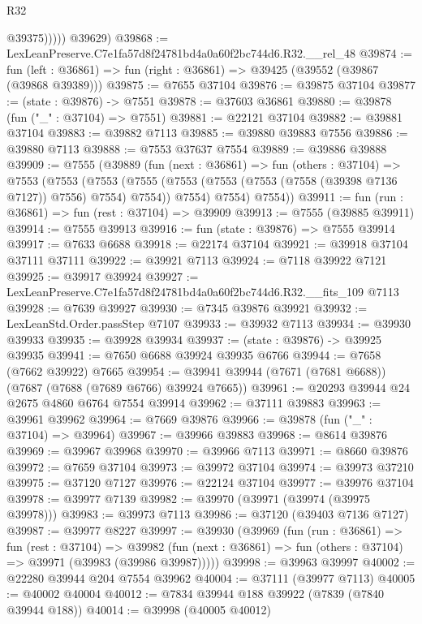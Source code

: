 \begin{lexlean}{R32}
\begin{coremodule}
                @39375)))))
      @39629)
@39868 := LexLeanPreserve.C7e1fa57d8f24781bd4a0a60f2bc744d6.R32.__rel_48
@39874 := fun (left : @36861) => fun (right : @36861) => @39425 (@39552 (@39867 (@39868 @39389)))
@39875 := @7655 @37104
@39876 := @39875 @37104
@39877 := (state : @39876) -> @7551
@39878 := @37603 @36861
@39880 := @39878 (fun ("_" : @37104) => @7551)
@39881 := @22121 @37104
@39882 := @39881 @37104
@39883 := @39882 @7113
@39885 := @39880 @39883 @7556
@39886 := @39880 @7113
@39888 := @7553 @37637 @7554
@39889 := @39886 @39888
@39909 := @7555
    (@39889
      (fun (next : @36861) =>
      fun (others : @37104) =>
      @7553
        (@7553
          (@7553
            (@7555 (@7553 (@7553 (@7553 (@7558 (@39398 @7136 @7127)) @7556) @7554) @7554))
            @7554)
          @7554)
        @7554))
@39911 := fun (run : @36861) => fun (rest : @37104) => @39909
@39913 := @7555 (@39885 @39911)
@39914 := @7555 @39913
@39916 := fun (state : @39876) => @7555 @39914
@39917 := @7633 @6688
@39918 := @22174 @37104
@39921 := @39918 @37104 @37111 @37111
@39922 := @39921 @7113
@39924 := @7118 @39922 @7121
@39925 := @39917 @39924
@39927 := LexLeanPreserve.C7e1fa57d8f24781bd4a0a60f2bc744d6.R32.__fits_109 @7113
@39928 := @7639 @39927
@39930 := @7345 @39876 @39921
@39932 := LexLeanStd.Order.passStep @7107
@39933 := @39932 @7113
@39934 := @39930 @39933
@39935 := @39928 @39934
@39937 := (state : @39876) -> @39925 @39935
@39941 := @7650 @6688 @39924 @39935 @6766
@39944 := @7658 (@7662 @39922) @7665
@39954 := @39941 @39944 (@7671 (@7681 @6688)) (@7687 (@7688 (@7689 @6766) @39924 @7665))
@39961 := @20293 @39944 @24 @2675 @4860 @6764 @7554 @39914
@39962 := @37111 @39883
@39963 := @39961 @39962
@39964 := @7669 @39876
@39966 := @39878 (fun ("_" : @37104) => @39964)
@39967 := @39966 @39883
@39968 := @8614 @39876
@39969 := @39967 @39968
@39970 := @39966 @7113
@39971 := @8660 @39876
@39972 := @7659 @37104
@39973 := @39972 @37104
@39974 := @39973 @37210
@39975 := @37120 @7127
@39976 := @22124 @37104
@39977 := @39976 @37104
@39978 := @39977 @7139
@39982 := @39970 (@39971 (@39974 (@39975 @39978)))
@39983 := @39973 @7113
@39986 := @37120 (@39403 @7136 @7127)
@39987 := @39977 @8227
@39997 := @39930
    (@39969
      (fun (run : @36861) =>
      fun (rest : @37104) =>
      @39982 (fun (next : @36861) => fun (others : @37104) => @39971 (@39983 (@39986 @39987)))))
@39998 := @39963 @39997
@40002 := @22280 @39944 @204 @7554 @39962
@40004 := @37111 (@39977 @7113)
@40005 := @40002 @40004
@40012 := @7834 @39944 @188 @39922 (@7839 (@7840 @39944 @188))
@40014 := @39998 (@40005 @40012)

\end{coremodule}
\end{lexlean}
